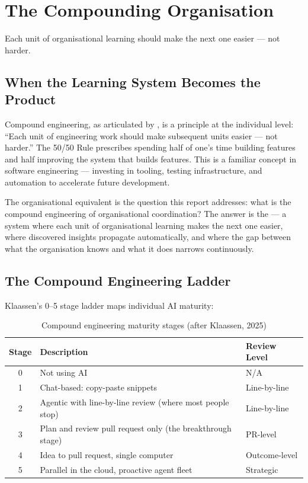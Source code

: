 \chapter{The Compounding Organisation}
\label{ch:compounding-org}

\epigraph{Each unit of organisational learning should make the next one easier --- not harder.}{}

\section{When the Learning System Becomes the Product}

Compound engineering, as articulated by \textcite{Klaassen2025}, is a principle at the individual level: ``Each unit of engineering work should make subsequent units easier --- not harder.'' The 50/50 Rule prescribes spending half of one's time building features and half improving the system that builds features. This is a familiar concept in software engineering --- investing in tooling, testing infrastructure, and automation to accelerate future development.

The organisational equivalent is the question this report addresses: what is the compound engineering of organisational coordination? The answer is the  --- a system where each unit of organisational learning makes the next one easier, where discovered insights propagate automatically, and where the gap between what the organisation knows and what it does narrows continuously.

\section{The Compound Engineering Ladder}

Klaassen's 0--5 stage ladder maps individual AI maturity:

\begin{table}[h]
\centering
\caption{Compound engineering maturity stages (after Klaassen, 2025)}
\label{tab:compound-ladder}
\begin{tabularx}{\textwidth}{c X l}
\toprule
\textbf{Stage} & \textbf{Description} & \textbf{Review Level} \\
\midrule
0 & Not using AI & N/A \\
1 & Chat-based: copy-paste snippets & Line-by-line \\
2 & Agentic with line-by-line review (where most people stop) & Line-by-line \\
3 & Plan and review pull request only (the breakthrough stage) & PR-level \\
4 & Idea to pull request, single computer & Outcome-level \\
5 & Parallel in the cloud, proactive agent fleet & Strategic \\
\bottomrule
\end{tabularx}
\end{table}

